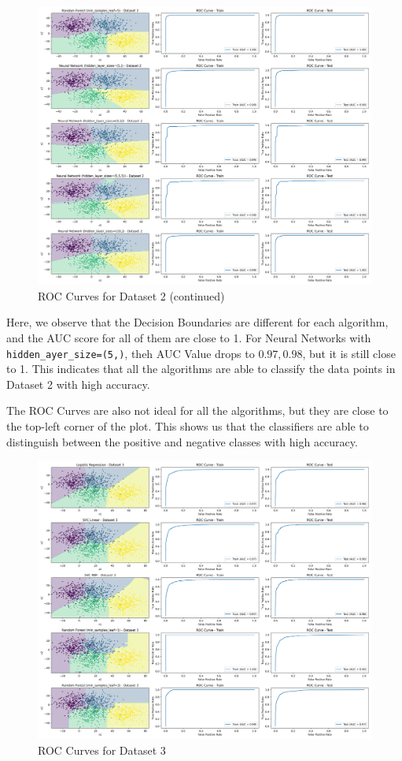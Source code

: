 \begin{figure}[H]
    \centering
    \includegraphics[width=\textwidth]{Images/dataset-2-roc-curves-2.png}
    \caption{ROC Curves for Dataset 2 (continued)}
\end{figure}

Here, we observe that the Decision Boundaries are different for each algorithm, and the AUC score for all of them are close to 1. For Neural Networks with \texttt{hidden\_ayer\_size=(5,)}, theh AUC Value drops to $0.97, 0.98$, but it is still close to 1. This indicates that all the algorithms are able to classify the data points in Dataset 2 with high accuracy.

The ROC Curves are also not ideal for all the algorithms, but they are close to the top-left corner of the plot. This shows us that the classifiers are able to distinguish between the positive and negative classes with high accuracy.

\begin{figure}[H]
    \centering
    \includegraphics[width=\textwidth]{Images/dataset-3-roc-curves-1.png}
    \caption{ROC Curves for Dataset 3}
\end{figure}

